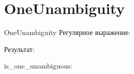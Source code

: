 \section{OneUnambiguity}
\begin{frame}{OneUnambiguity}
	Регулярное выражение:

	Результат:

	is_one_unambiguous:


\end{frame}

